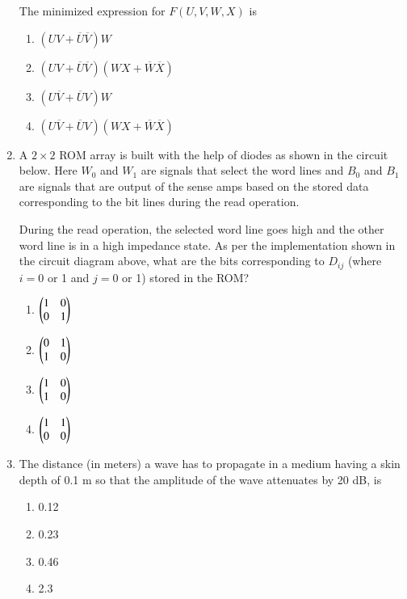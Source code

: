 \documentclass{article}
\begin{document}
\begin{enumerate}
The minimized expression for $F(U, V, W, X)$ is
\begin{enumerate}
\item $(U V + \overline{U} \overline{V}) W$
\item $(U V + \overline{U} \overline{V}) (W X + \overline{W} \overline{X})$
\item $(U \overline{V} + \overline{U} V) W$
\item $(U \overline{V} + \overline{U} V) (W X + \overline{W} \overline{X})$
\end{enumerate}

\item A $2 \times 2$ ROM array is built with the help of diodes as shown in the circuit below. Here $W_0$ and $W_1$ are signals that select the word lines and $B_0$ and $B_1$ are signals that are output of the sense amps based on the stored data corresponding to the bit lines during the read operation.
\begin{figure}[H]
    \centering
    
    \caption{}
    \label{fig:q42}
\end{figure}
During the read operation, the selected word line goes high and the other word line is in a high impedance state. As per the implementation shown in the circuit diagram above, what are the bits corresponding to $D_{ij}$ (where $i = 0$ or 1 and $j = 0$ or 1) stored in the ROM?
\begin{multicols}{4}
\begin{enumerate}
\item $\begin{pmatrix}1 & 0 \\ 0 & 1\end{pmatrix} $
\item $\begin{pmatrix}0 & 1 \\ 1 & 0\end{pmatrix} $
\item $\begin{pmatrix}1 & 0 \\ 1 & 0\end{pmatrix} $
\item $\begin{pmatrix}1 & 1 \\ 0 & 0\end{pmatrix} $
\end{enumerate}
\end{multicols}

\item The distance (in meters) a wave has to propagate in a medium having a skin depth of 0.1 m so that the amplitude of the wave attenuates by 20 dB, is
\begin{multicols}{4}
\begin{enumerate}
\item 0.12
\item 0.23
\item 0.46
\item 2.3
\end{enumerate}
\end{multicols}


\end{enumerate}
\end{document}
